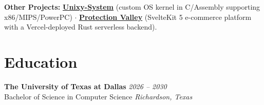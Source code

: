\documentclass[10pt,letterpaper]{article}
\begin{document}
\vspace{6pt}
\noindent\textbf{Other Projects:} \textbf{\href{https://github.com/yahya-azeem/Unixy-System}{\color{primary}Unixy-System}} (custom OS kernel in C/Assembly supporting x86/MIPS/PowerPC) $\cdot$ \textbf{\href{https://github.com/yahya-azeem/Protection-Valley}{\color{primary}Protection Valley}} (SvelteKit 5 e-commerce platform with a Vercel-deployed Rust serverless backend).

\section*{Education}
\noindent\textbf{\color{primary}The University of Texas at Dallas} \hfill \textit{2026 -- 2030} \\
Bachelor of Science in Computer Science \hfill \textit{Richardson, Texas}
\end{document}
